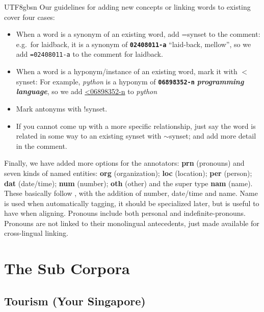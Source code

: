 \documentclass[12pt]{book} %
\newcommand{\lex}[1]{\textbf{\textit{#1}}}
\newcommand{\of}[1]{\textbf{\texttt{#1}}}
\begin{document}
\begin{CJK}{UTF8}{gbsn}
Our guidelines for adding new concepts or linking words to existing
cover four cases:
\begin{itemize}
\item [=] When a word is a synonym of an existing word, add
=synset to the comment: e.g.\ for laidback, it is a synonym of
\of{02408011-a} ``laid-back, mellow'', so we
add \texttt{=02408011-a} to the comment for laidback.
\item[\textless]  When a word
is a hyponym/instance of an existing word, mark it with
$<$synset: For example, \textit{python} is a hyponym of
\of{06898352-n} \lex{programming language}, so we
add \url{<06898352-n} to \textit{python}
\item[!] Mark antonyms with !synset.
\item[$\sim$] If you cannot come up with a more specific
relationship, just say the  word is related in some way to an existing
synset with  $\sim$synset; and add more detail in the comment.
\end{itemize}


Finally, we have added more options for the annotators: \textbf{prn}
(pronouns) and seven kinds of named entities: \textbf{org}
(organization); \textbf{loc} (location); \textbf{per} (person);
\textbf{dat} (date/time); \textbf{num} (number); \textbf{oth} (other)
and the super type \textbf{nam} (name).  These basically follow
\citet[p207]{Landes:Leacock:Fellbaum:1998}, with the addition of
number, date/time and name.  Name is used when automatically tagging,
it should be specialized later, but is useful to have when aligning.
Pronouns include both personal and indefinite-pronouns.  Pronouns are
not linked to their monolingual antecedents, just made available for
cross-lingual linking.
\chapter{The Sub Corpora}


\section{Tourism (Your Singapore)}


\end{CJK}
\end{document}

